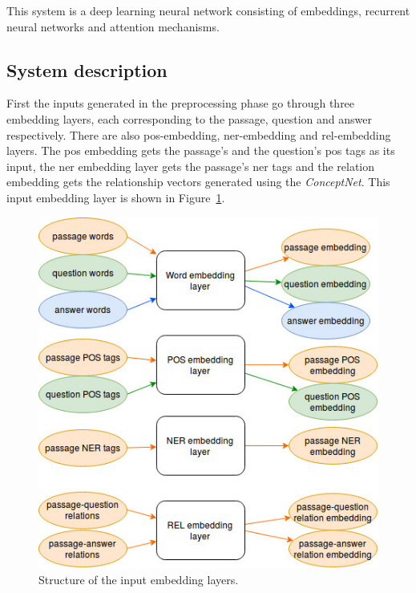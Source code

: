 This system is a deep learning neural network consisting of embeddings, recurrent neural networks and attention mechanisms.


\subsection{System description}

First the inputs generated in the preprocessing phase go through three embedding layers, each corresponding to the passage, question and answer respectively. There are also pos-embedding, ner-embedding and rel-embedding layers. The pos embedding gets the passage's and the question's pos tags as its input, the ner embedding layer gets the passage's ner tags and the relation embedding gets the relationship vectors generated using the \textit{ConceptNet}. This input embedding layer is shown in Figure~\ref{fig:embedding}.
\begin{figure}[h!]
	\centering
	\includegraphics[scale=0.5]{TriAN_embeddings.jpg}
	\caption{Structure of the input embedding layers.}
	\label{fig:embedding}
\end{figure}

